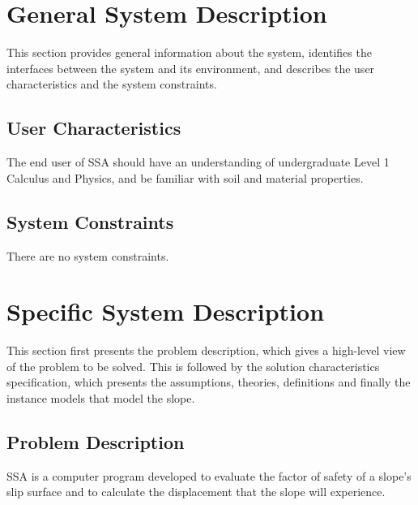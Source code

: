 \documentclass[12pt]{article}
\begin{document}
\section{General System Description}
\label{Sec:GSD}
This section provides general information about the system, identifies the interfaces between the system and its environment, and describes the user characteristics and the system constraints.
\subsection{User Characteristics}
\label{Sec:UC}
The end user of SSA should have an understanding of undergraduate Level 1 Calculus and Physics, and be familiar with soil and material properties.
\subsection{System Constraints}
\label{Sec:SC}
There are no system constraints.
\section{Specific System Description}
\label{Sec:SSD}
This section first presents the problem description, which gives a high-level view of the problem to be solved. This is followed by the solution characteristics specification, which presents the assumptions, theories, definitions and finally the instance models that model the slope.
\subsection{Problem Description}
\label{Sec:PD}
SSA is a computer program developed to evaluate the factor of safety of a slope's slip surface and to calculate the displacement that the slope will experience.
\end{document}
